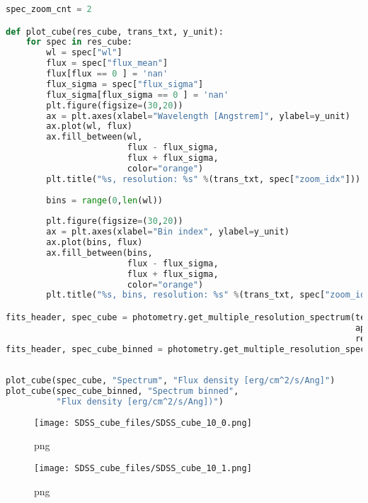 \begin{lstlisting}[language=Python]
spec_zoom_cnt = 2

def plot_cube(res_cube, trans_txt, y_unit):
    for spec in res_cube:
        wl = spec["wl"]
        flux = spec["flux_mean"]
        flux[flux == 0 ] = 'nan'
        flux_sigma = spec["flux_sigma"]
        flux_sigma[flux_sigma == 0 ] = 'nan'
        plt.figure(figsize=(30,20))
        ax = plt.axes(xlabel="Wavelength [Angstrem]", ylabel=y_unit)
        ax.plot(wl, flux)
        ax.fill_between(wl, 
                        flux - flux_sigma, 
                        flux + flux_sigma, 
                        color="orange")
        plt.title("%s, resolution: %s" %(trans_txt, spec["zoom_idx"]))
        
        bins = range(0,len(wl))
        
        plt.figure(figsize=(30,20))
        ax = plt.axes(xlabel="Bin index", ylabel=y_unit)
        ax.plot(bins, flux)
        ax.fill_between(bins, 
                        flux - flux_sigma, 
                        flux + flux_sigma, 
                        color="orange")
        plt.title("%s, bins, resolution: %s" %(trans_txt, spec["zoom_idx"]))

fits_header, spec_cube = photometry.get_multiple_resolution_spectrum(test_spectrum, spec_zoom_cnt,
                                                                     apply_rebin=False, rebin_min=0, rebin_max=0,
                                                                     rebin_samples=0, apply_transmission=False)
fits_header, spec_cube_binned = photometry.get_multiple_resolution_spectrum(test_spectrum, spec_zoom_cnt,
                                                                            apply_rebin=True, rebin_min=3600, rebin_max=10400,
                                                                            rebin_samples=4620, apply_transmission=False)
plot_cube(spec_cube, "Spectrum", "Flux density [erg/cm^2/s/Ang]")
plot_cube(spec_cube_binned, "Spectrum binned", 
          "Flux density [erg/cm^2/s/Ang])")
\end{lstlisting}

\begin{figure}
\centering
\texttt{[image: SDSS\_cube\_files/SDSS\_cube\_10\_0.png]}
\caption{png}
\end{figure}

\begin{figure}
\centering
\texttt{[image: SDSS\_cube\_files/SDSS\_cube\_10\_1.png]}
\caption{png}
\end{figure}

